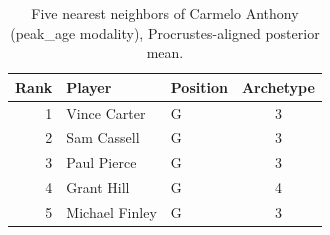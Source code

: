\begin{table}[htbp]
  \centering\small
  \begin{tabular}{rllc}
    \toprule
    Rank & Player & Position & Archetype \\
    \midrule
    1 & Vince Carter & G & 3 \\
    2 & Sam Cassell & G & 3 \\
    3 & Paul Pierce & G & 3 \\
    4 & Grant Hill & G & 4 \\
    5 & Michael Finley & G & 3 \\
    \bottomrule
  \end{tabular}
  \caption{Five nearest neighbors of Carmelo Anthony (peak_age modality), Procrustes-aligned posterior mean.}
  \label{tab:Carmelo_Anthony_neighbors_peak_age}
\end{table}

